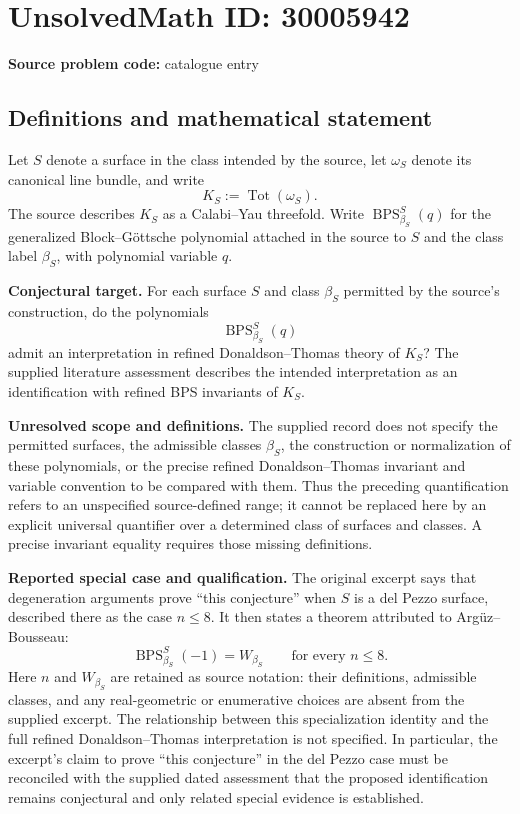\documentclass[11pt]{article}
\begin{document}
\section*{UnsolvedMath ID: 30005942}
\textbf{Source problem code:} catalogue entry
\subsection{Definitions and mathematical statement}
Let \(S\) denote a surface in the class intended by the source, let \(\omega_S\) denote its canonical line bundle, and write
\[
K_S:=\operatorname{Tot}(\omega_S).
\]
The source describes \(K_S\) as a Calabi--Yau threefold. Write \(\operatorname{BPS}_{\beta_S}^{S}(q)\) for the generalized Block--Göttsche polynomial attached in the source to \(S\) and the class label \(\beta_S\), with polynomial variable \(q\).

\textbf{Conjectural target.} For each surface \(S\) and class \(\beta_S\) permitted by the source's construction, do the polynomials
\[
\operatorname{BPS}_{\beta_S}^{S}(q)
\]
admit an interpretation in refined Donaldson--Thomas theory of \(K_S\)? The supplied literature assessment describes the intended interpretation as an identification with refined BPS invariants of \(K_S\).

\textbf{Unresolved scope and definitions.} The supplied record does not specify the permitted surfaces, the admissible classes \(\beta_S\), the construction or normalization of these polynomials, or the precise refined Donaldson--Thomas invariant and variable convention to be compared with them. Thus the preceding quantification refers to an unspecified source-defined range; it cannot be replaced here by an explicit universal quantifier over a determined class of surfaces and classes. A precise invariant equality requires those missing definitions.

\textbf{Reported special case and qualification.} The original excerpt says that degeneration arguments prove ``this conjecture'' when \(S\) is a del Pezzo surface, described there as the case \(n\leq 8\). It then states a theorem attributed to Arg\"uz--Bousseau:
\[
\operatorname{BPS}_{\beta_S}^{S}(-1)=W_{\beta_S}
\qquad\text{for every }n\leq 8.
\]
Here \(n\) and \(W_{\beta_S}\) are retained as source notation: their definitions, admissible classes, and any real-geometric or enumerative choices are absent from the supplied excerpt. The relationship between this specialization identity and the full refined Donaldson--Thomas interpretation is not specified. In particular, the excerpt's claim to prove ``this conjecture'' in the del Pezzo case must be reconciled with the supplied dated assessment that the proposed identification remains conjectural and only related special evidence is established.
\end{document}
